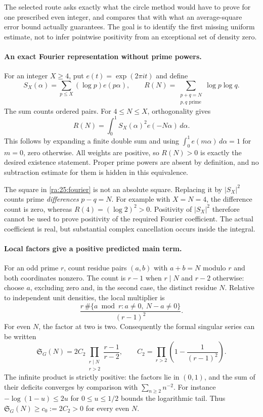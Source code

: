 \documentclass[11pt]{article}
\begin{document}
The selected route asks exactly what the circle method would have to
prove for one prescribed even integer, and compares that with what an
average-square error bound actually guarantees. The goal is to identify
the first missing uniform estimate, not to infer pointwise positivity
from an exceptional set of density zero.

\paragraph{An exact Fourier representation without prime powers.}
For an integer $X\ge4$, put $e(t)=\exp(2\pi i t)$ and define
\[
 S_X(\alpha)=\sum_{p\le X}(\log p)e(p\alpha),\qquad
 R(N)=\sum_{\substack{p+q=N\\p,q\text{ prime}}}\log p\log q.
\]
The sum counts ordered pairs. For $4\le N\le X$, orthogonality gives
\begin{equation}\label{ra:25:fourier}
 R(N)=\int_0^1 S_X(\alpha)^2e(-N\alpha)\,d\alpha.
\end{equation}
This follows by expanding a finite double sum and using
$\int_0^1e(m\alpha)\,d\alpha=1$ for $m=0$, zero otherwise.
All weights are positive, so $R(N)>0$ is exactly the desired existence
statement. Proper prime powers are absent by definition, and no
subtraction estimate for them is hidden in this equivalence.

The square in \eqref{ra:25:fourier} is not an absolute square.
Replacing it by $|S_X|^2$ counts prime \emph{differences} $p-q=N$.
For example with $X=N=4$, the difference count is zero, whereas
$R(4)=(\log2)^2>0$. Positivity of $|S_X|^2$ therefore cannot be used
to prove positivity of the required Fourier coefficient. The actual
coefficient is real, but substantial complex cancellation occurs inside
the integral.

\paragraph{Local factors give a positive predicted main term.}
For an odd prime $r$, count residue pairs $(a,b)$ with $a+b=N$ modulo
$r$ and both coordinates nonzero. The count is $r-1$ when $r\mid N$
and $r-2$ otherwise: choose $a$, excluding zero and, in the second case,
the distinct residue $N$. Relative to independent unit densities, the
local multiplier is
\[
 \frac{r\,\#\{a\bmod r:a\ne0,\ N-a\ne0\}}{(r-1)^2}.
\]
For even $N$, the factor at two is two. Consequently the formal
singular series can be written
\begin{equation}\label{ra:25:series}
 \mathfrak S_G(N)=2C_2
      \prod_{\substack{r\mid N\\r>2}}\frac{r-1}{r-2},
 \qquad C_2=\prod_{r>2}\left(1-\frac1{(r-1)^2}\right).
\end{equation}
The infinite product is strictly positive: the factors lie in $(0,1)$,
and the sum of their deficits converges by comparison with
$\sum_{n\ge2}n^{-2}$. For instance $-\log(1-u)\le2u$ for
$0\le u\le1/2$ bounds the logarithmic tail. Thus
$\mathfrak S_G(N)\ge c_0:=2C_2>0$ for every even $N$.
\end{document}
